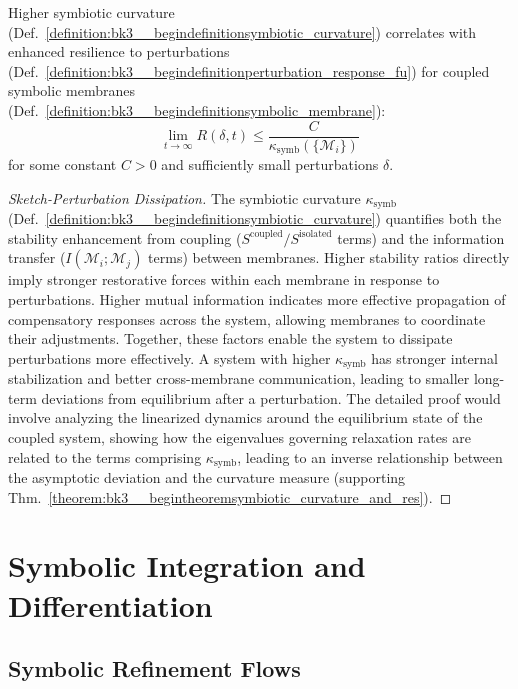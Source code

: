 \begin{theorem} \label{theorem:bk3__begintheoremsymbiotic_curvature_and_res}
Higher symbiotic curvature (Def.~\ref{definition:bk3__begindefinitionsymbiotic_curvature}) correlates with enhanced resilience to perturbations (Def.~\ref{definition:bk3__begindefinitionperturbation_response_fu}) for coupled symbolic membranes (Def.~\ref{definition:bk3__begindefinitionsymbolic_membrane}):
\[
\lim_{t \rightarrow \infty} R(\delta, t) \leq \frac{C}{\kappa_{\text{symb}}(\{\mathcal{M}_i\})}
\]
for some constant $C > 0$ and sufficiently small perturbations $\delta$.
\end{theorem}

\begin{proof}[Sketch-Perturbation Dissipation]
\label{proof:bk3_sketch_perturbation_dissiptation}
The symbiotic curvature $\kappa_{\text{symb}}$ (Def.~\ref{definition:bk3__begindefinitionsymbiotic_curvature}) quantifies both the stability enhancement from coupling ($S^{\text{coupled}}/S^{\text{isolated}}$ terms) and the information transfer ($I(\mathcal{M}_i; \mathcal{M}_j)$ terms) between membranes. Higher stability ratios directly imply stronger restorative forces within each membrane in response to perturbations. Higher mutual information indicates more effective propagation of compensatory responses across the system, allowing membranes to coordinate their adjustments. Together, these factors enable the system to dissipate perturbations more effectively. A system with higher $\kappa_{\text{symb}}$ has stronger internal stabilization and better cross-membrane communication, leading to smaller long-term deviations from equilibrium after a perturbation. The detailed proof would involve analyzing the linearized dynamics around the equilibrium state of the coupled system, showing how the eigenvalues governing relaxation rates are related to the terms comprising $\kappa_{\text{symb}}$, leading to an inverse relationship between the asymptotic deviation and the curvature measure (supporting Thm.~\ref{theorem:bk3__begintheoremsymbiotic_curvature_and_res}).
\end{proof}

\section{Symbolic Integration and Differentiation}
\subsection{Symbolic Refinement Flows}

